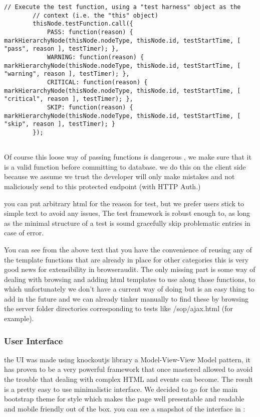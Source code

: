 \begin{verbatim}
// Execute the test function, using a "test harness" object as the
		// context (i.e. the "this" object)
		thisNode.testFunction.call({
			PASS: function(reason) { markHierarchyNode(thisNode.nodeType, thisNode.id, testStartTime, [ "pass", reason ], testTimer); },
			WARNING: function(reason) { markHierarchyNode(thisNode.nodeType, thisNode.id, testStartTime, [ "warning", reason ], testTimer); },
			CRITICAL: function(reason) { markHierarchyNode(thisNode.nodeType, thisNode.id, testStartTime, [ "critical", reason ], testTimer); },
			SKIP: function(reason) { markHierarchyNode(thisNode.nodeType, thisNode.id, testStartTime, [ "skip", reason ], testTimer); }
		});
	      
\end{verbatim}

Of course this loose way of passing functions is dangerous , we make sure that it is a valid function before  committing to database.
we do this on the client side because we assume we trust the developer will only make mistakes and not maliciously send to this 
protected endpoint (with HTTP Auth.)

you can put arbitrary html for the reason for test, but we prefer users stick to simple text to avoid any issues, 
The test framework is robust enough to, as long as the minimal structure of a test is sound gracefully skip problematic entries in case of error.

You can see from the above text that you have the convenience of reusing any of the template functions that are already in place for other categories
this is very good news for extensibility in browseraudit. The only missing part is some way of dealing with browsing and adding html templates
to use along those functions, to which unfortunately we don't have a current way of doing but is an easy thing to add in the future and we
can already tinker manually to find these by browsing the server folder directories corresponding to tests like /sop/ajax.html (for example).

\subsubsection{User Interface}

the UI was made using knockoutjs \cite{knockoutjs} library a Model-View-View Model pattern, it has proven to be a very powerful framework that once mastered allowed
to avoid the trouble that dealing with complex HTML and events can become. The result is a pretty easy to use minimalistic interface. We decided
to go for the main bootstrap theme for style which makes the page well presentable and readable and mobile friendly out of the box.
you can see a snapshot of the interface in :



